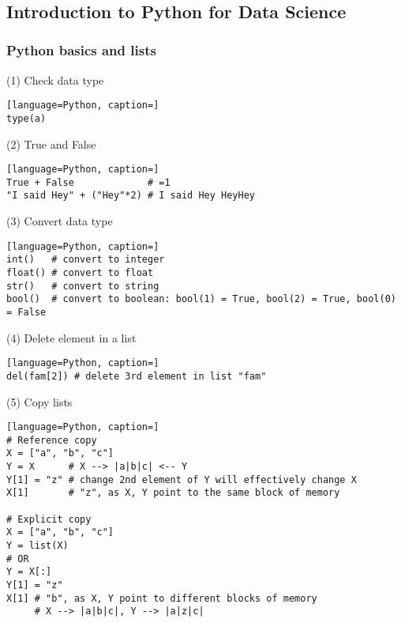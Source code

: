 \documentclass[12pt]{article}
\date{}
\begin{document}
\begin{center}
     \\[5pt]
\end{center}

\subsection{\large Introduction to Python for Data Science}
\subsubsection{\normalsize Python basics and lists}
(1) Check data type
\begin{lstlisting}[language=Python, caption=]
type(a)
\end{lstlisting}

\noindent
(2) True and False
\begin{lstlisting}[language=Python, caption=]
True + False             # =1
"I said Hey" + ("Hey"*2) # I said Hey HeyHey
\end{lstlisting}

\noindent 
(3) Convert data type
\begin{lstlisting}[language=Python, caption=]
int()   # convert to integer
float() # convert to float
str()   # convert to string
bool()  # convert to boolean: bool(1) = True, bool(2) = True, bool(0) = False
\end{lstlisting}

\noindent 
(4) Delete element in a list
\begin{lstlisting}[language=Python, caption=]
del(fam[2]) # delete 3rd element in list "fam"
\end{lstlisting}

\noindent 
(5) Copy lists
\begin{lstlisting}[language=Python, caption=]
# Reference copy
X = ["a", "b", "c"]
Y = X      # X --> |a|b|c| <-- Y
Y[1] = "z" # change 2nd element of Y will effectively change X
X[1]       # "z", as X, Y point to the same block of memory

# Explicit copy
X = ["a", "b", "c"]
Y = list(X) 
# OR 
Y = X[:] 
Y[1] = "z"
X[1] # "b", as X, Y point to different blocks of memory
     # X --> |a|b|c|, Y --> |a|z|c|
\end{lstlisting}
\end{document}
